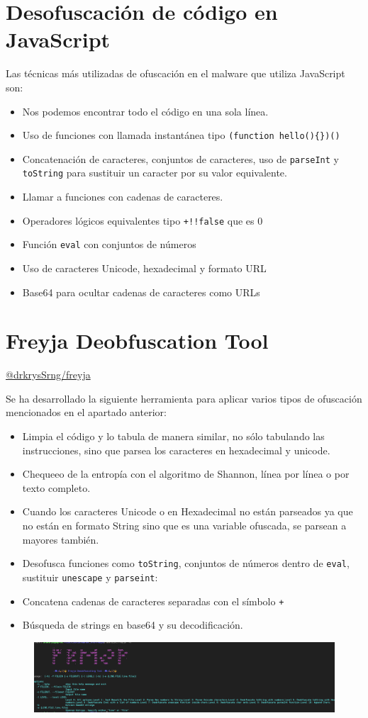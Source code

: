 \documentclass[a4paper]{article}
\begin{document}
	\section{Desofuscación de código en JavaScript}
	Las técnicas más utilizadas de ofuscación en el malware que utiliza JavaScript son:
	\begin{itemize}
		\item Nos podemos encontrar todo el código en una sola línea.
		\item Uso de funciones con llamada instantánea tipo \verb*|(function hello(){})()|
		\item Concatenación de caracteres, conjuntos de caracteres, uso de \verb*|parseInt| y \verb*|toString| para sustituir un caracter por su valor equivalente.
		\item Llamar a funciones con cadenas de caracteres.
		\item Operadores lógicos equivalentes tipo \verb*|+!!false| que es 0
		\item Función \verb*|eval| con conjuntos de números
		\item Uso de caracteres Unicode, hexadecimal y formato URL
		\item Base64 para ocultar cadenas de caracteres como URLs	
	\end{itemize}
	
	\section{Freyja Deobfuscation Tool }
	\href{https://github.com/drkrysSrng/freyja}{@drkrysSrng/freyja}
	
	Se ha desarrollado la siguiente herramienta para aplicar varios tipos de ofuscación mencionados en el apartado anterior:
	
	\begin{itemize}
		\item Limpia el código y lo tabula de manera similar, no sólo tabulando las instrucciones, sino que parsea los caracteres en hexadecimal y unicode.
		\item Chequeeo de la entropía con el algoritmo de Shannon, línea por línea o por texto completo.
		\item Cuando los caracteres Unicode o en Hexadecimal no están parseados ya que no están en formato String sino que es una variable ofuscada, se parsean a mayores también.
		\item Desofusca funciones como \verb*|toString|, conjuntos de números dentro de \verb*|eval|, sustituir \verb*|unescape| y \verb*|parseint|:
		\item Concatena cadenas de caracteres separadas con el símbolo \verb*|+|
		\item Búsqueda de strings en base64 y su decodificación.
	\end{itemize}

	\begin{figure}[H]
		\centering
		\includegraphics[width=18cm]{images/usage.png}
	\end{figure}
\end{document}
